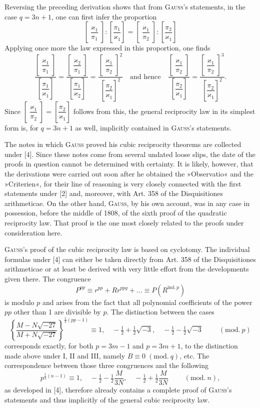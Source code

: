 
Reversing the preceding derivation shows that from \textsc{Gauss}'s statements, in the
case $q=3n+1$, one can first infer the proportion
\[
\left[\dfrac{\varkappa_1}{\pi_1}\right]:\left[\dfrac{\pi_1}{\varkappa_1}\right]=\left[\dfrac{\varkappa_1}{\pi_2}\right]:\left[\dfrac{\pi_2}{\varkappa_1}\right]
\]
Applying once more the law expressed in this proportion, one finds
\[
\dfrac{\left[\dfrac{\varkappa_1}{\pi_1}\right]}{\left[\dfrac{\pi_1}{\varkappa_1}\right]}=\dfrac{\left[\dfrac{\varkappa_2}{\pi_1}\right]}{\left[\dfrac{\pi_1}{\varkappa_2}\right]}=\dfrac{\left[\dfrac{\varkappa_1}{\pi_2}\right]^2}{\left[\dfrac{\pi_2}{\varkappa_1}\right]^2}
\quad\text{and hence}\quad
\dfrac{\left[\dfrac{\varkappa_1}{\pi_2}\right]}{\left[\dfrac{\pi_2}{\varkappa_1}\right]}=\dfrac{\left[\dfrac{\varkappa_1}{\pi_2}\right]^3}{\left[\dfrac{\pi_2}{\varkappa_1}\right]^2}.
\]
Since $\left[\dfrac{\varkappa_1}{\pi_2}\right]=\left[\dfrac{\pi_2}{\varkappa_1}\right]$ follows from this, the general reciprocity law in its simplest form is, for $q=3n+1$ as well, implicitly contained in \textsc{Gauss}'s statements.

The notes in which \textsc{Gauss} proved his cubic reciprocity theorems are collected under [4]. Since these notes come from several undated loose slips, the date of the proofs in question cannot be determined with certainty. It is
likely, however, that the derivations were carried out soon after he obtained the »Observatio« and the »Criterien«,
for their line of reasoning is very closely connected with the first statements under [2]
and, moreover, with Art. 358 of the Disquisitiones arithmeticae. On the other hand, \textsc{Gauss}, by his own
account, was in any case in possession, before the middle of 1808, of the sixth proof of the quadratic
reciprocity law. That proof is the one most closely related to the proofs under consideration here.

\textsc{Gauss}'s proof of the cubic reciprocity law is based on cyclotomy. The
individual formulas under [4] can either be taken directly from Art. 358 of the Disquisitiones arithmeticae or at least be derived with very little effort from the developments given there.
The congruence
\[
P^{pp}\equiv r^{pp}+Rr^{ppg}+\ldots\equiv P(R^{\mathrm{ind.}\,p})
\]
is modulo $p$ and arises from the fact that all polynomial coefficients of the power $pp$ other than 1 are divisible by $p$. The distinction between the cases
\[
\left\{\dfrac{M-N\sqrt{-27}}{M+N\sqrt{-27}}\right\}^{\frac13(pp-1)}\equiv 1,\quad -\tfrac12+\tfrac12\sqrt{-3},\quad -\tfrac12-\tfrac12\sqrt{-3}\qquad\;(\mathrm{mod.}\ p)
\]
corresponds exactly, for both $p=3m-1$ and $p=3m+1$, to the distinction made above under I, II and III,
namely $B\equiv 0\;(\mathrm{mod.}\ q)$, etc. The correspondence between those three congruences and the following
\[
p^{\frac13(n-1)}\equiv 1,\quad -\tfrac12-\tfrac12\dfrac{M}{3N},\quad -\tfrac12+\tfrac12\dfrac{M}{3N}\qquad\;(\mathrm{mod.}\ n),
\]
as developed in [4], therefore already contains a complete proof of \textsc{Gauss}'s statements
and thus implicitly of the general cubic reciprocity law.

